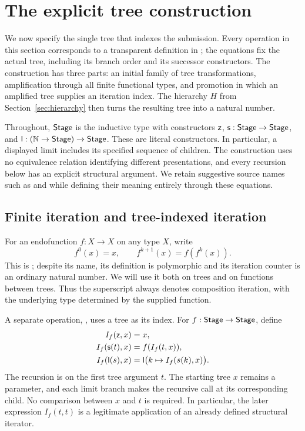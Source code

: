 \section{The explicit tree construction}\label{sec:tree-recipe}

We now specify the single tree that indexes the submission. Every operation
in this section corresponds to a transparent definition in
; the equations fix the actual tree, including its branch
order and its successor constructors. The construction has three parts:
an initial family of tree transformations, amplification through all finite
functional types, and promotion in which an amplified tree supplies an
iteration index. The hierarchy \(H\) from Section~\ref{sec:hierarchy}
then turns the resulting tree into a natural number.

Throughout, \(\mathsf{Stage}\) is the inductive type with constructors
\(\mathsf z\), \(\mathsf s:\mathsf{Stage}\to\mathsf{Stage}\), and
\(\mathsf l:(\mathbb N\to\mathsf{Stage})\to\mathsf{Stage}\). These are literal constructors.
In particular, a displayed limit includes its specified sequence of
children. The construction uses no equivalence relation identifying
different presentations, and every recursion below has an explicit
structural argument. We retain suggestive source names such as
 and  while defining their meaning entirely
through these equations.

\subsection{Finite iteration and tree-indexed iteration}

For an endofunction \(f:X\to X\) on any type \(X\), write
\[
 f^0(x)=x,\qquad f^{k+1}(x)=f(f^k(x)).
\]
This is ; despite its name, its definition is polymorphic
and its iteration counter is an ordinary natural number. We will use it
both on trees and on functions between trees. Thus the superscript always
denotes composition iteration, with the underlying type determined by
the supplied function.

A separate operation, , uses a tree as its index. For
\(f:\mathsf{Stage}\to\mathsf{Stage}\), define
\begin{align}
 I_f(\mathsf z,x)&=x,\nonumber\\
 I_f(\mathsf s(t),x)&=f(I_f(t,x)),\label{eq:tree-iteration}\\
 I_f(\mathsf l(s),x)&=\mathsf l\bigl(k\mapsto I_f(s(k),x)\bigr).\nonumber
\end{align}
The recursion is on the first tree argument \(t\). The starting tree
\(x\) remains a parameter, and each limit branch makes the recursive call
at its corresponding child. No comparison between \(x\) and \(t\) is
required. In particular, the later expression \(I_f(t,t)\) is a legitimate
application of an already defined structural iterator.

